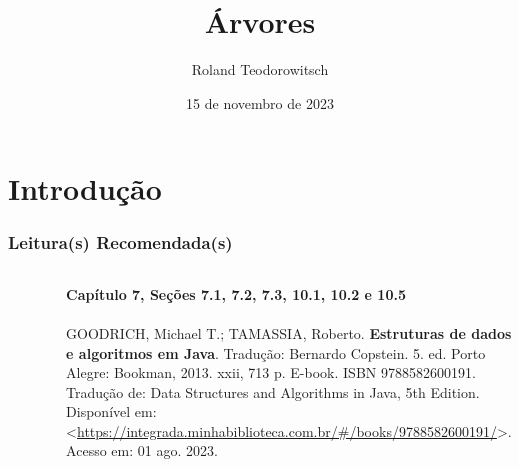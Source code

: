 \documentclass[aspectratio=169]{beamer}
\title[\sc{Árvores}]{Árvores}
\author[Roland Teodorowitsch]{Roland Teodorowitsch}
\institute[ALEST I - EP - PUCRS]{Algoritmos e Estruturas de Dados I - Escola Politécnica - PUCRS}
\date{15 de novembro de 2023}
\begin{document}
\justifying

\begin{frame}
	\titlepage
\end{frame}

\section{Introdução}

\begin{frame}\frametitle{Leitura(s) Recomendada(s)}

\begin{columns}[T]
\begin{column}{0.15\linewidth}
\vspace{-3mm}
\begin{figure}[h]
	\centering
	\includegraphics[height=0.3\paperheight]{imagens/livro_goodrich.jpg}
\end{figure}
\end{column}
\begin{column}{0.85\linewidth}
\tiny{\textbf{Capítulo 7, Seções 7.1, 7.2, 7.3, 10.1, 10.2 e 10.5}\\
~}\\
\scriptsize{GOODRICH, Michael T.; TAMASSIA, Roberto. \textbf{Estruturas de dados e algoritmos em Java}. Tradução: Bernardo Copstein. 5. ed. Porto Alegre: Bookman, 2013. xxii, 713 p. E-book. ISBN 9788582600191. Tradução de: Data Structures and Algorithms in Java, 5th Edition. Disponível em: \textless{}\url{https://integrada.minhabiblioteca.com.br/\#/books/9788582600191/}\textgreater{}. Acesso em: 01 ago. 2023.}
\end{column}
\end{columns}

\end{frame}

\end{document}

